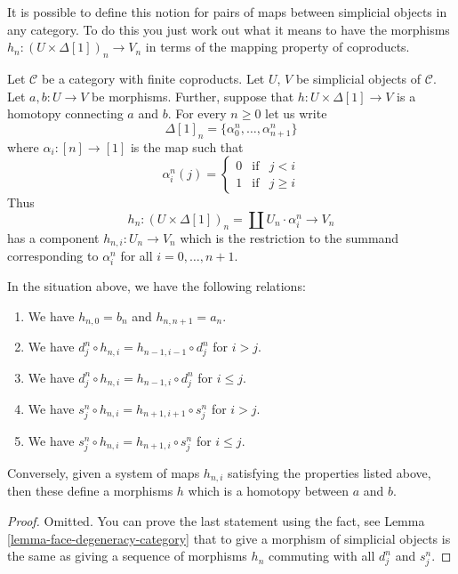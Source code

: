 \noindent
It is possible to define this notion for pairs of
maps between simplicial objects in any category.
To do this you just work out what it means to
have the morphisms $h_n : (U \times \Delta[1])_n \to V_n$
in terms of the mapping property of coproducts.

\medskip\noindent
Let $\mathcal{C}$ be a category with finite coproducts.
Let $U$, $V$ be simplicial objects of $\mathcal{C}$.
Let $a, b : U \to V$ be morphisms. Further, suppose
that $h : U \times \Delta[1] \to V$ is a homotopy
connecting $a$ and $b$. For every $n \geq 0$
let us write
$$
\Delta[1]_n = \{\alpha^n_0, \ldots, \alpha^n_{n + 1}\}
$$
where $\alpha_i : [n] \to [1]$ is the map
such that
$$
\alpha^n_i(j)
=
\left\{
\begin{matrix}
0 & \text{if} & j < i\\
1 & \text{if} & j \geq i
\end{matrix}
\right.
$$
Thus
$$
h_n : (U \times \Delta[1])_n = \coprod U_n \cdot \alpha^n_i
\longrightarrow
V_n
$$
has a component $h_{n, i} : U_n \to V_n$ which is the restriction
to the summand corresponding to $\alpha^n_i$ for all $i = 0, \ldots, n + 1$.

\begin{lemma}
\label{lemma-relations-homotopy}
In the situation above, we have the following relations:
\begin{enumerate}
\item We have $h_{n, 0} = b_n$ and $h_{n, n + 1} = a_n$.
\item We have $d^n_j \circ h_{n, i} = h_{n - 1, i - 1} \circ d^n_j$
for $i > j$.
\item We have $d^n_j \circ h_{n, i} = h_{n - 1, i} \circ d^n_j$
for $i \leq j$.
\item We have $s^n_j \circ h_{n, i} = h_{n + 1, i + 1} \circ s^n_j$
for $i > j$.
\item We have $s^n_j \circ h_{n, i} = h_{n + 1, i} \circ s^n_j$
for $i \leq j$.
\end{enumerate}
Conversely, given a system of maps $h_{n, i}$ satisfying the
properties listed above, then these define a morphisms
$h$ which is a homotopy between $a$ and $b$.
\end{lemma}

\begin{proof}
Omitted. You can prove the last statement using the fact,
see Lemma \ref{lemma-face-degeneracy-category} that
to give a morphism of simplicial objects is the
same as giving a sequence of morphisms $h_n$ commuting
with all $d^n_j$ and $s^n_j$.
\end{proof}


